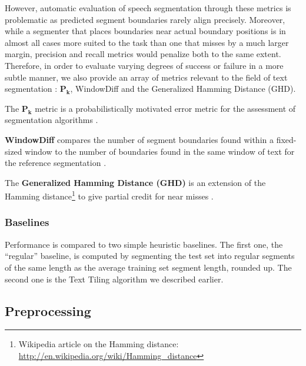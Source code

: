 However, automatic evaluation of speech segmentation through these metrics is problematic as predicted segment boundaries rarely align precisely. Moreover, while a segmenter that places boundaries near actual boundary positions is in almost all cases more suited to the task than one that misses by a much larger margin, precision and recall metrics would penalize both to the same extent. Therefore, in order to evaluate varying degrees of success or failure in a more subtle manner, we also provide an array of metrics relevant to the field of text segmentation : $\bm{P_{k}}$, WindowDiff and the Generalized Hamming Distance (GHD).

The $\bm{P_{k}}$ metric is a probabilistically motivated error metric for the assessment of segmentation algorithms \cite{beeferman1999statistical}.

\textbf{WindowDiff} compares the number of segment boundaries found within a fixed-sized window to the number of boundaries found in the same window of text for the reference segmentation \cite{pevzner2002critique}.

The \textbf{Generalized Hamming Distance (GHD)} is an extension of the Hamming distance\footnote{Wikipedia article on the Hamming distance: \url{http://en.wikipedia.org/wiki/Hamming_distance}} to give partial credit for near misses \cite{bookstein2002generalized}.

\subsubsection{Baselines}

Performance is compared to two simple heuristic baselines. The first one, the ``regular'' baseline, is computed by segmenting the test set into regular segments of the same length as the average training set segment length, rounded up. The second one is the Text Tiling algorithm we described earlier.

\subsection{Preprocessing}


